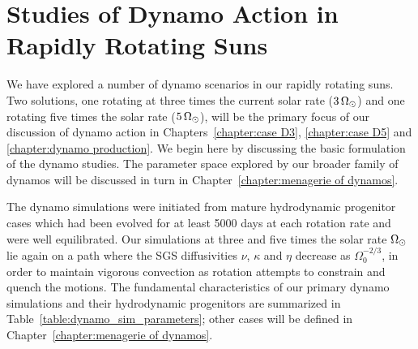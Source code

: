  
 






\section{Studies of Dynamo Action in Rapidly Rotating Suns}
We have explored a number of dynamo scenarios in our rapidly rotating
suns.  Two solutions, one rotating at three times the current solar
rate ($3\thinspace\Omega_\odot$) and one rotating five times the solar
rate ($5\thinspace\Omega_\odot$), will be the primary
focus of our discussion of dynamo action in Chapters~\ref{chapter:case D3},
\ref{chapter:case D5} and \ref{chapter:dynamo production}.  We begin here by discussing the
basic formulation of the dynamo studies.  The parameter space explored by
our broader family of dynamos will be discussed in turn in
Chapter~\ref{chapter:menagerie of dynamos}. 


The dynamo simulations were initiated from mature hydrodynamic
progenitor cases which had been evolved for at least 5000 
days at each rotation rate and were well equilibrated.  
Our simulations at three and five times the solar rate
$\Omega_\odot$ lie again on a path where the SGS 
diffusivities $\nu$, $\kappa$ and $\eta$ decrease as
$\Omega_0^{-2/3}$, in order to maintain vigorous convection as rotation
attempts to constrain and quench the motions.  
The fundamental characteristics of our primary dynamo simulations 
and their hydrodynamic progenitors are summarized in
Table~\ref{table:dynamo_sim_parameters}; other cases will be defined
in Chapter~\ref{chapter:menagerie of dynamos}. 

